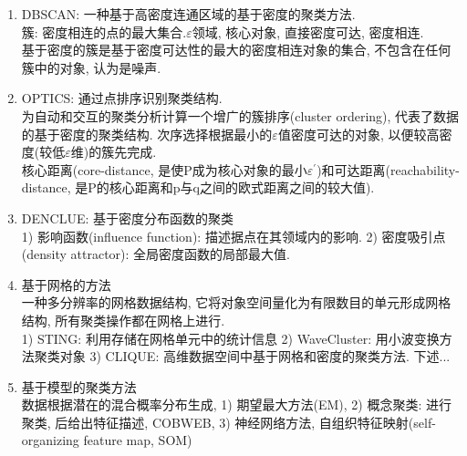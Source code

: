 \documentclass[a4paper,10pt,english]{article}
\begin{document}
\begin {enumerate}
\item {DBSCAN}: 一种基于高密度连通区域的基于密度的聚类方法. \\
簇: 密度相连的点的最大集合.$\varepsilon$领域, 核心对象, 直接密度可达, 密度相连. \\
基于密度的簇是基于密度可达性的最大的密度相连对象的集合, 不包含在任何簇中的对象, 认为是噪声.

\item {OPTICS}: 通过点排序识别聚类结构.\\
为自动和交互的聚类分析计算一个增广的簇排序(cluster ordering), 代表了数据的基于密度的聚类结构. 次序选择根据最小的$\varepsilon$值密度可达的对象, 以便较高密度(较低$\varepsilon$维)的簇先完成.\\
核心距离(core-distance, 是使P成为核心对象的最小$\varepsilon^{'}$)和可达距离(reachability-distance, 是P的核心距离和p与q之间的欧式距离之间的较大值).

\item {DENCLUE}: 基于密度分布函数的聚类\\
1) 影响函数(influence function): 描述据点在其领域内的影响.
2) 密度吸引点(density attractor): 全局密度函数的局部最大值.

\item {基于网格的方法}\\
一种多分辨率的网格数据结构, 它将对象空间量化为有限数目的单元形成网格结构, 所有聚类操作都在网格上进行.\\
1) STING: 利用存储在网格单元中的统计信息
2) WaveCluster: 用小波变换方法聚类对象
3) CLIQUE: 高维数据空间中基于网格和密度的聚类方法. 下述...

\item {基于模型的聚类方法}\\
数据根据潜在的混合概率分布生成, 1) 期望最大方法(EM), 2) 概念聚类: 进行聚类, 后给出特征描述, COBWEB, 3) 神经网络方法, 自组织特征映射(self-organizing feature map, SOM)
\end {enumerate}
\end{document}
